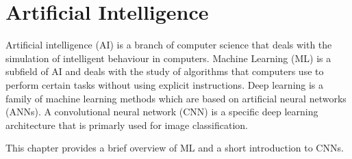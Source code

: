 \section{Artificial Intelligence}
\label{sec:ai}

Artificial intelligence (AI) is a branch of computer science that deals with the simulation of intelligent behaviour in computers.
Machine Learning (ML) is a subfield of AI and deals with the study of algorithms that computers use to perform certain tasks without using explicit instructions.
Deep learning is a family of machine learning methods which are based on artificial neural networks (ANNs).
A convolutional neural network (CNN) is a specific deep learning architecture that is primarly used for image classification.

This chapter provides a brief overview of ML and a short introduction to CNNs.



